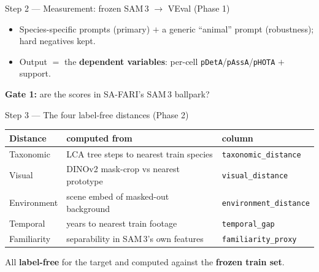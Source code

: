 \documentclass[aspectratio=169,11pt]{beamer}
\newcommand{\frozen}[1]{{\color{navy}\textbf{#1}}}
\begin{document}
\begin{frame}{Step 2 --- Measurement: frozen SAM\,3 $\to$ VEval \small(Phase 1)}
  \centering
  \vspace{0.5em}
  \begin{itemize}\footnotesize
    \item Species-specific prompts (primary) $+$ a generic ``animal'' prompt (robustness); hard negatives kept.
    \item Output $=$ the \textbf{dependent variables}: per-cell \texttt{pDetA}/\texttt{pAssA}/\texttt{pHOTA} $+$ support.
  \end{itemize}
  \centering\footnotesize\textcolor{burnt}{\textbf{Gate 1:} are the scores in SA-FARI's SAM\,3 ballpark?}
\end{frame}

\begin{frame}{Step 3 --- The four label-free distances \small(Phase 2)}
  \centering\footnotesize
  \begin{tabular}{@{}lll@{}}
    \toprule
    \textbf{Distance} & \textbf{computed from} & \textbf{column}\\
    \midrule
    Taxonomic   & LCA tree steps to nearest train species & \texttt{taxonomic\_distance}\\
    Visual      & DINOv2 mask-crop vs nearest prototype    & \texttt{visual\_distance}\\
    Environment & scene embed of masked-out background     & \texttt{environment\_distance}\\
    Temporal    & years to nearest train footage           & \texttt{temporal\_gap}\\
    Familiarity & separability in SAM\,3's own features    & \texttt{familiarity\_proxy}\\
    \bottomrule
  \end{tabular}
  \vspace{0.6em}

  All \textbf{label-free} for the target and computed against the \frozen{frozen train set}.
\end{frame}
\end{document}
